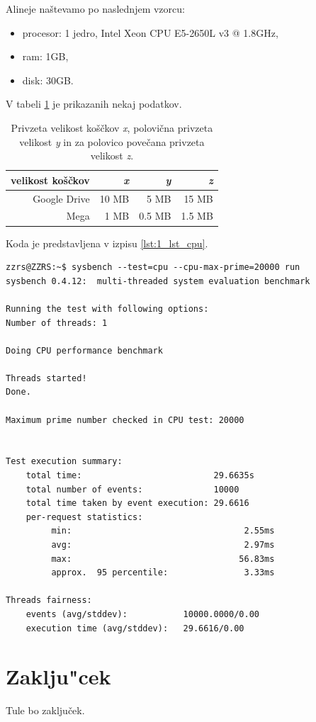 Alineje naštevamo po naslednjem vzorcu:
\begin{itemize}
\item procesor: 1 jedro, Intel Xeon CPU E5-2650L v3 @ 1.8GHz,
\item ram: 1GB,
\item disk: 30GB.
\end{itemize}

V tabeli \ref{table:1_chunks} je prikazanih nekaj podatkov.
\begin{table}[H]
    \centering
        \begin{tabular}{ | r | r | r | r |} 
            \hline
           velikost koščkov & \textit{x} & \textit{y} & \textit{z} \\
            \hline
            Google Drive & 10 MB & 5 MB & 15 MB \\
            Mega & 1 MB & 0.5 MB & 1.5 MB \\
            \hline
        \end{tabular}
        \caption{Privzeta velikost koščkov \textit{x}, polovična privzeta velikost \textit{y} in za polovico povečana privzeta velikost \textit{z}.}
    \label{table:1_chunks}
\end{table}

Koda je predstavljena v izpisu \ref{lst:1_lst_cpu}.
\begin{lstlisting}[caption={Primer testiranja procesorja.}, label={lst:1_lst_cpu}]
zzrs@ZZRS:~$ sysbench --test=cpu --cpu-max-prime=20000 run
sysbench 0.4.12:  multi-threaded system evaluation benchmark

Running the test with following options:
Number of threads: 1

Doing CPU performance benchmark

Threads started!
Done.

Maximum prime number checked in CPU test: 20000


Test execution summary:
    total time:                          29.6635s
    total number of events:              10000
    total time taken by event execution: 29.6616
    per-request statistics:
         min:                                  2.55ms
         avg:                                  2.97ms
         max:                                 56.83ms
         approx.  95 percentile:               3.33ms

Threads fairness:
    events (avg/stddev):           10000.0000/0.00
    execution time (avg/stddev):   29.6616/0.00
\end{lstlisting}


\section{Zaklju"cek}
Tule bo zaključek.

